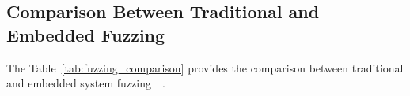 


\subsection{Comparison Between Traditional and Embedded Fuzzing}

The Table~\ref{tab:fuzzing_comparison} provides the comparison between traditional
and embedded system fuzzing~\cite{yun2022fuzzing}~\cite{9742291}.

